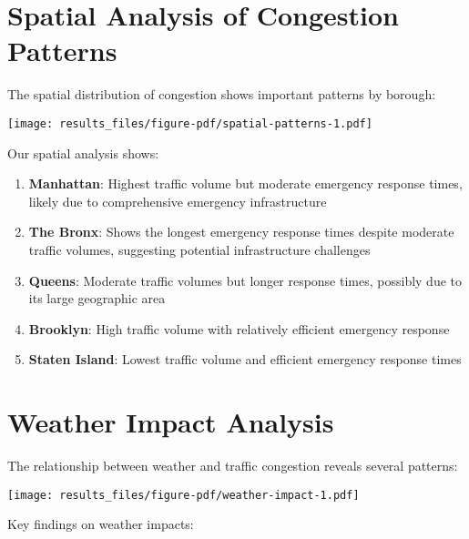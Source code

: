 \documentclass[
  letterpaper,
  DIV=11,
  numbers=noendperiod]{scrreprt}
\begin{document}
\section{Spatial Analysis of Congestion
Patterns}\label{spatial-analysis-of-congestion-patterns}

The spatial distribution of congestion shows important patterns by
borough:

\texttt{[image: results\_files/figure-pdf/spatial-patterns-1.pdf]}

Our spatial analysis shows:

\begin{enumerate}
\def\labelenumi{\arabic{enumi}.}
\item
  \textbf{Manhattan}: Highest traffic volume but moderate emergency
  response times, likely due to comprehensive emergency infrastructure
\item
  \textbf{The Bronx}: Shows the longest emergency response times despite
  moderate traffic volumes, suggesting potential infrastructure
  challenges
\item
  \textbf{Queens}: Moderate traffic volumes but longer response times,
  possibly due to its large geographic area
\item
  \textbf{Brooklyn}: High traffic volume with relatively efficient
  emergency response
\item
  \textbf{Staten Island}: Lowest traffic volume and efficient emergency
  response times
\end{enumerate}

\section{Weather Impact Analysis}\label{weather-impact-analysis}

The relationship between weather and traffic congestion reveals several
patterns:

\texttt{[image: results\_files/figure-pdf/weather-impact-1.pdf]}

Key findings on weather impacts:
\end{document}
